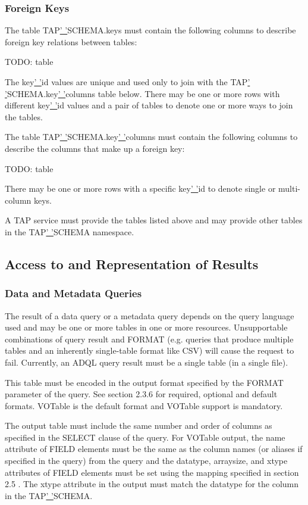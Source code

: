 \documentclass[11pt,a4paper]{ivoa}
\begin{document}
\subsubsection{Foreign Keys}
The table TAP\underline{' '}SCHEMA.keys must contain the following columns to 
describe foreign key relations between tables:

TODO: table

The key\underline{' '}id values are unique and used only to join with the 
TAP\underline{' '}SCHEMA.key\underline{' '}columns table below. There may be 
one or more rows with different key\underline{' '}id values and a pair 
of tables to denote one or more ways to join the tables.

The table TAP\underline{' '}SCHEMA.key\underline{' '}columns must contain the 
following columns to describe the columns that make up a foreign key:

TODO: table

There may be one or more rows with a specific key\underline{' '}id to 
denote single or multi-column keys.

A TAP service must provide the tables listed above and may provide other tables 
in the TAP\underline{' '}SCHEMA namespace.

\subsection{Access to and Representation of Results}
\subsubsection{Data and Metadata Queries}
The result of a data query or a metadata query depends on the query language 
used and may be one or more tables in one or more resources. Unsupportable 
combinations of query result and FORMAT (e.g. queries that produce multiple 
tables and an inherently single-table format like CSV) will cause the request to 
fail. Currently, an ADQL query result must be a single table (in a single file).

This table must be encoded in the output format specified by the FORMAT 
parameter of the query. See section 2.3.6 for required, optional and default 
formats. VOTable is the default format and VOTable support is mandatory.

The output table must include the same number and order of columns as specified 
in the SELECT clause of the query. For VOTable output, the name attribute of 
FIELD elements must be the same as the column names (or aliases if specified in 
the query) from the query and the datatype, arraysize, and xtype attributes of 
FIELD elements must be set using the mapping specified in section 2.5 . The 
xtype attribute in the output must match the datatype for the column in the 
TAP\underline{' '}SCHEMA.
\end{document}
